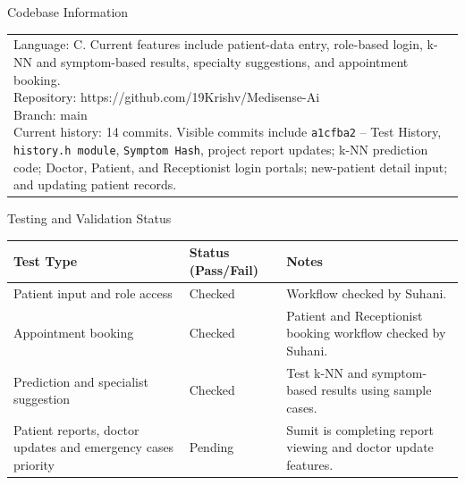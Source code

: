 \documentclass[12pt,a4paper]{article}
\newcommand{\sectiontitle}[1]{%
    {\color{GEUBlue}
    \fontsize{18}{22}\selectfont #1}
}
\newcommand{\answerbox}[2]{%
    \begin{tabularx}{\textwidth}{
        |>{\raggedright\arraybackslash}X|}
        \hline
        \parbox[t][#1][t]{\dimexpr\linewidth-12pt\relax}{
            \vspace{5pt}
            \fontsize{11}{13}\selectfont #2
        }\\
        \hline
    \end{tabularx}
}
\begin{document}
\newpage


\vspace*{0.20cm}

\sectiontitle{Codebase Information }

\vspace{0.05cm}


\vspace{0.20cm}

\answerbox{4.00cm}{
Language: C. Current features include patient-data entry, role-based login,
k-NN and symptom-based results, specialty suggestions, and appointment
booking.\\
Repository: https://github.com/19Krishv/Medisense-Ai\\
Branch: main\\
Current history: 14 commits. Visible commits include
\texttt{a1cfba2} -- Test History,
\texttt{history.h module}, 
\texttt{Symptom Hash},
project report updates; k-NN prediction code;
Doctor, Patient, and Receptionist login portals; new-patient detail
input; and updating patient records.}
\vspace{0.65cm}

\sectiontitle{Testing and Validation Status }

\vspace{0.05cm}


\vspace{0.30cm}

\begin{tabularx}{\textwidth}{
|>{\raggedright\arraybackslash}p{}
|>{\raggedright\arraybackslash}p{}
|>{\raggedright\arraybackslash}X|}
\hline
\textbf{Test Type} & \textbf{Status (Pass/Fail)} & \textbf{Notes}\\
\hline
Patient input and role access & Checked & Workflow checked by Suhani.\\
\hline
Appointment booking & Checked & Patient and Receptionist booking workflow checked by Suhani.\\
\hline
Prediction and specialist suggestion & Checked & Test k-NN and symptom-based results using sample cases.\\
\hline
Patient reports, doctor updates and emergency cases priority & Pending & Sumit is completing report viewing and doctor update features.\\
\hline
\end{tabularx}
\end{document}
